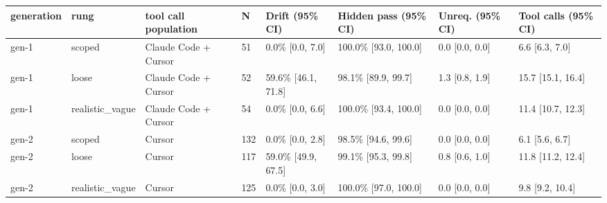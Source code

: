\begin{tabular}{llllllll}
\toprule
generation & rung & tool call population & N & Drift (95\% CI) & Hidden pass (95\% CI) & Unreq. (95\% CI) & Tool calls (95\% CI) \\
\midrule
gen-1 & scoped & Claude Code + Cursor & 51 & 0.0\% [0.0, 7.0] & 100.0\% [93.0, 100.0] & 0.0 [0.0, 0.0] & 6.6 [6.3, 7.0] \\
gen-1 & loose & Claude Code + Cursor & 52 & 59.6\% [46.1, 71.8] & 98.1\% [89.9, 99.7] & 1.3 [0.8, 1.9] & 15.7 [15.1, 16.4] \\
gen-1 & realistic\_vague & Claude Code + Cursor & 54 & 0.0\% [0.0, 6.6] & 100.0\% [93.4, 100.0] & 0.0 [0.0, 0.0] & 11.4 [10.7, 12.3] \\
gen-2 & scoped & Cursor & 132 & 0.0\% [0.0, 2.8] & 98.5\% [94.6, 99.6] & 0.0 [0.0, 0.0] & 6.1 [5.6, 6.7] \\
gen-2 & loose & Cursor & 117 & 59.0\% [49.9, 67.5] & 99.1\% [95.3, 99.8] & 0.8 [0.6, 1.0] & 11.8 [11.2, 12.4] \\
gen-2 & realistic\_vague & Cursor & 125 & 0.0\% [0.0, 3.0] & 100.0\% [97.0, 100.0] & 0.0 [0.0, 0.0] & 9.8 [9.2, 10.4] \\
\bottomrule
\end{tabular}
